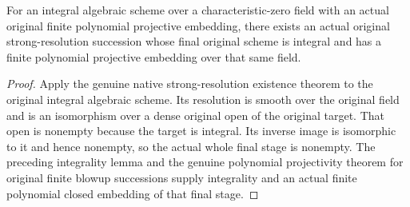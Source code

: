 \begin{theorem}
\label{thm:fc-polynomial-projective-strong-resolution}
\leanok
{}
For an integral algebraic scheme over a characteristic-zero field with an
actual original finite polynomial projective embedding, there exists an
actual original strong-resolution succession whose final original scheme
is integral and has a finite polynomial projective embedding over that same field.
\end{theorem}
\begin{proof}
Apply the genuine native strong-resolution existence theorem to the original
integral algebraic scheme.  Its resolution is smooth over the original field
and is an isomorphism over a dense original open of the original target.
That open is nonempty because the target is integral.  Its inverse image is
isomorphic to it and hence nonempty, so the actual whole final stage is
nonempty.  The preceding integrality lemma and the genuine polynomial
projectivity theorem for original finite blowup successions supply integrality
and an actual finite polynomial closed embedding of that final stage.
\end{proof}
